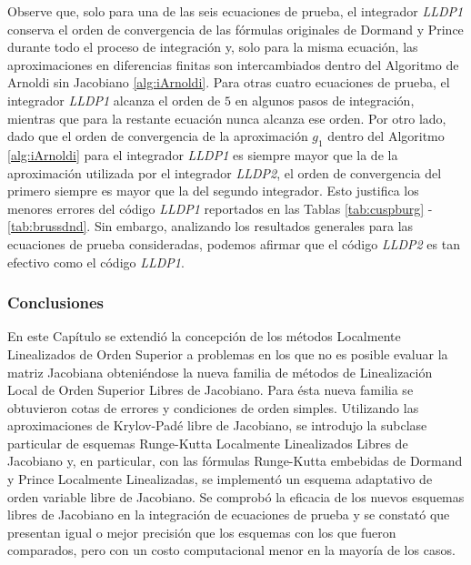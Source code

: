 Observe que, solo para una de las seis ecuaciones de prueba, el integrador \emph{LLDP1} conserva el orden de convergencia de las fórmulas originales de Dormand y Prince durante todo el proceso de integración y, solo para la misma ecuación, las aproximaciones en diferencias finitas son intercambiados dentro del Algoritmo de Arnoldi sin Jacobiano \ref{alg:iArnoldi}. Para otras cuatro ecuaciones de prueba, el integrador \emph{LLDP1} alcanza el orden de $5$ en algunos pasos de integración, mientras que para la restante ecuación nunca alcanza ese orden. Por otro lado, dado que el orden de convergencia de la aproximación $g_1$ dentro del Algoritmo \ref{alg:iArnoldi} para el integrador \emph{LLDP1} es siempre mayor que la de la aproximación utilizada por el integrador \emph{LLDP2}, el orden de convergencia del primero siempre es mayor que la del segundo integrador. Esto justifica los menores errores del código \emph{LLDP1} reportados en las Tablas \ref{tab:cuspburg} - \ref{tab:brussdnd}. Sin embargo, analizando los resultados generales para las ecuaciones de prueba consideradas, podemos afirmar que el código \emph{LLDP2} es tan efectivo como el código \emph{LLDP1}.


\subsubsection{Conclusiones}
En este Capítulo se extendió la concepción de los métodos Localmente Linealizados de Orden Superior a problemas en los que no es posible evaluar la matriz Jacobiana obteniéndose la nueva familia de métodos de Linealización Local de Orden Superior Libres de Jacobiano. Para ésta nueva familia se obtuvieron cotas de errores y condiciones de orden simples. Utilizando las aproximaciones de Krylov-Padé libre de Jacobiano, se introdujo la subclase particular de esquemas Runge-Kutta Localmente Linealizados
Libres de Jacobiano y, en particular, con las fórmulas Runge-Kutta embebidas de Dormand y Prince Localmente Linealizadas, se implementó un esquema adaptativo de orden variable libre de Jacobiano. Se comprobó la eficacia de los nuevos esquemas libres de Jacobiano en la integración de
ecuaciones de prueba y se constató que presentan igual o mejor precisión que los esquemas con los que fueron comparados, pero con un costo computacional menor en la mayoría de los casos.

